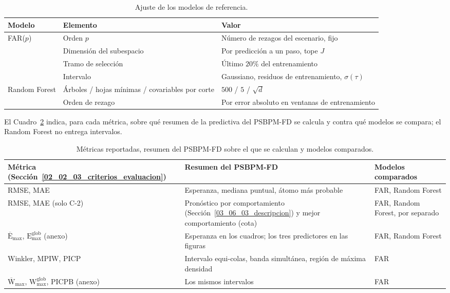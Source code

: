 \begin{table}[H]
\centering\small
\caption{Ajuste de los modelos de referencia.}
\label{tab:dis_referencia}
\begin{tabular}{p{} p{} p{}}
\hline
Modelo & Elemento & Valor \\
\hline
FAR($p$) & Orden $p$                       & Número de rezagos del escenario, fijo \\
         & Dimensión del subespacio       & Por predicción a un paso, tope $J$ \\
         & Tramo de selección              & Último $20\%$ del entrenamiento \\
         & Intervalo                       & Gaussiano, residuos de entrenamiento, $\sigma(\tau)$ \\
Random Forest & Árboles / hojas mínimas / covariables por corte & $500$ / $5$ / $\sqrt{d}$ \\
         & Orden de rezago                 & Por error absoluto en ventanas de entrenamiento \\
\hline
\end{tabular}
\end{table}

El Cuadro~\ref{tab:dis_resumen_metrica} indica, para cada métrica, sobre qué resumen de la predictiva del PSBPM-FD se calcula y contra qué modelos se compara; el Random Forest no entrega intervalos.

\begin{table}[H]
\centering\small
\caption{Métricas reportadas, resumen del PSBPM-FD sobre el que se calculan y modelos comparados.}
\label{tab:dis_resumen_metrica}
\begin{tabular}{p{} p{} p{}}
\hline
Métrica (Sección~\ref{02_02_03_criterios_evaluacion}) & Resumen del PSBPM-FD & Modelos comparados \\
\hline
RMSE, MAE & Esperanza, mediana puntual, átomo más probable & FAR, Random Forest \\
RMSE, MAE (solo C-2) & Pronóstico por comportamiento (Sección~\ref{03_06_03_descripcion}) y mejor comportamiento (cota) & FAR, Random Forest, por separado \\
$\overline{\mathrm{E}}_{\max}$, $\mathrm{E}_{\max}^{\mathrm{glob}}$ (anexo) & Esperanza en los cuadros; los tres predictores en las figuras & FAR, Random Forest \\
Winkler, MPIW, PICP & Intervalo equi-colas, banda simultánea, región de máxima densidad & FAR \\
$\overline{\mathrm{W}}_{\max}$, $\mathrm{W}_{\max}^{\mathrm{glob}}$, PICPB (anexo) & Los mismos intervalos & FAR \\
\hline
\end{tabular}
\end{table}

